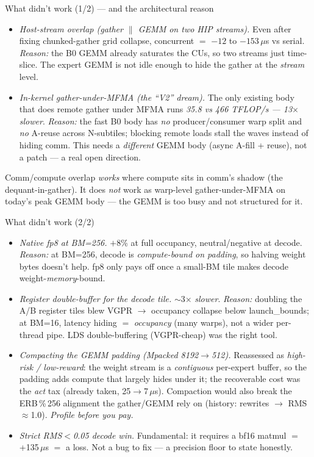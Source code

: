 \documentclass[pdf,aspectratio=169]{beamer}
\newcommand{\empy}[1]{{\color{darkorange}\emph{#1}}}
\newcommand{\empr}[1]{{\color{cardinalred}\emph{#1}}}
\newcommand{\examplebox}[2]{%
\begin{tcolorbox}[colframe=darkcardinal,colback=boxgray,title={#1}]
#2
\end{tcolorbox}}
\newcommand{\mc}[1]{{\ttfamily\small #1}}
\begin{document}
\begin{frame}{What didn't work (1/2) --- and the architectural reason}
\footnotesize
\begin{itemize}\footnotesize
  \item \empr{Host-stream overlap (gather $\|$ GEMM on two HIP streams).} Even after fixing chunked-gather grid collapse, concurrent $=$ $-12$ to $-153\,\mu$s vs serial. \empy{Reason:} the B0 GEMM already saturates the CUs, so two streams just time-slice. The expert GEMM is not idle enough to hide the gather at the \emph{stream} level.
  \item \empr{In-kernel gather-under-MFMA (the ``V2'' dream).} The only existing body that does remote gather under MFMA runs \empy{35.8 vs 466 TFLOP/s --- 13$\times$ slower}. \empy{Reason:} the fast B0 body has \emph{no} producer/consumer warp split and \emph{no} A-reuse across N-subtiles; blocking remote loads stall the waves instead of hiding comm. This needs a \emph{different} GEMM body (async A-fill + reuse), not a patch --- a real open direction.
\end{itemize}
\examplebox{The honest thesis boundary}{\footnotesize Comm/compute overlap \emph{works} where compute sits in comm's shadow (the dequant-in-gather). It does \emph{not} work as warp-level gather-under-MFMA on today's peak GEMM body --- the GEMM is too busy and not structured for it.}
\end{frame}

\begin{frame}{What didn't work (2/2)}
\footnotesize
\begin{itemize}\footnotesize
  \item \empr{Native fp8 at BM=256.} $+8$\% at full occupancy, neutral/negative at decode. \empy{Reason:} at BM=256, decode is \emph{compute-bound on padding}, so halving weight bytes doesn't help. fp8 only pays off once a small-BM tile makes decode weight-\emph{memory}-bound.
  \item \empr{Register double-buffer for the decode tile.} $\sim$3$\times$ \emph{slower}. \empy{Reason:} doubling the A/B register tiles blew VGPR $\to$ occupancy collapse below \mc{launch\_bounds}; at BM=16, latency hiding $=$ \emph{occupancy} (many warps), not a wider per-thread pipe. LDS double-buffering (VGPR-cheap) was the right tool.
  \item \empr{Compacting the GEMM padding (Mpacked 8192$\to$512).} Reassessed as \emph{high-risk / low-reward}: the weight stream is a \emph{contiguous} per-expert buffer, so the padding adds compute that largely hides under it; the recoverable cost was the \emph{act} tax (already taken, 25$\to$7\,$\mu$s). Compaction would also break the ERB\,\%\,256 alignment the gather/GEMM rely on (history: rewrites $\to$ RMS$\approx$1.0). \empy{Profile before you pay.}
  \item \empr{Strict RMS$<$0.05 decode win.} Fundamental: it requires a bf16 matmul $=$ +135\,$\mu$s $=$ a loss. Not a bug to fix --- a precision floor to state honestly.
\end{itemize}
\end{frame}
\end{document}
